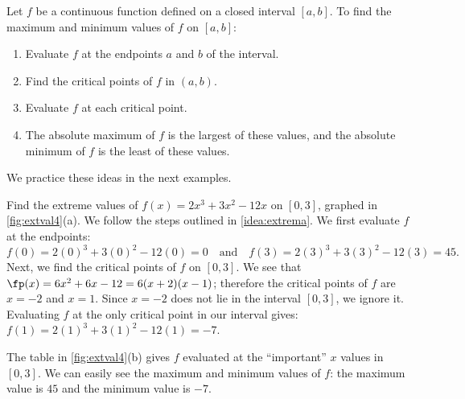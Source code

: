 \begin{keyidea}\label{idea:extrema}
Let $f$ be a continuous function defined on a closed interval $[a,b]$. To find the maximum and minimum values of $f$ on $[a,b]$:
	\begin{enumerate}
	\item		Evaluate $f$ at the endpoints $a$ and $b$ of the interval.
	\item		Find the critical points of $f$ in $(a,b)$.
	\item		Evaluate $f$ at each critical point.
	\item		The absolute maximum of $f$ is the largest of these values, and the absolute minimum of $f$ is the least of these values.
	\end{enumerate}
\end{keyidea}

We practice these ideas in the next examples.

\begin{example}\label{ex_extval4}
Find the extreme values of $f(x) = 2x^3+3x^2-12x$ on $[0,3]$, graphed in \autoref{fig:extval4}(a).
\solution
We follow the steps outlined in \autoref{idea:extrema}. We first evaluate $f$ at the endpoints:
%
%
\[f(0)=2(0)^3+3(0)^2-12(0) = 0 \quad \text{and}\quad f(3)=2(3)^3+3(3)^2-12(3) =45.\]
Next, we find the critical points of $f$ on $[0,3]$. We see that $\fp(x) = 6x^2+6x-12 = 6(x+2)(x-1)$; therefore the critical points of $f$ are $x=-2$ and $x=1$. Since $x=-2$ does not lie in the interval $[0,3]$, we ignore it. Evaluating $f$ at the only critical point in our interval gives: $f(1)=2(1)^3+3(1)^2-12(1) = -7$. 

The table in \autoref{fig:extval4}(b) gives $f$ evaluated at the ``important'' $x$ values in $[0,3]$. We can easily see the maximum and minimum values of $f$: the maximum value is $45$ and the minimum value is $-7$.
\end{example}

